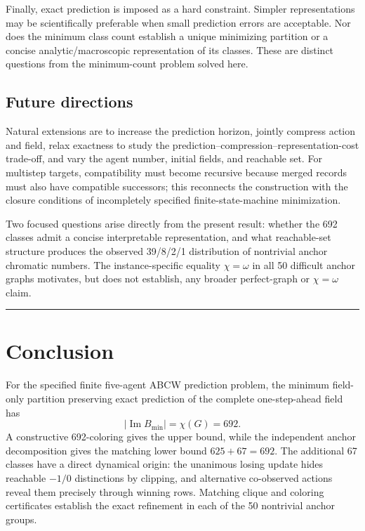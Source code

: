 \documentclass[
  11pt,
]{article}
\begin{document}
Finally, exact prediction is imposed as a hard constraint. Simpler
representations may be scientifically preferable when small prediction
errors are acceptable. Nor does the minimum class count establish a
unique minimizing partition or a concise analytic/macroscopic
representation of its classes. These are distinct questions from the
minimum-count problem solved here.

\subsection{Future directions}\label{future-directions}

Natural extensions are to increase the prediction horizon, jointly
compress action and field, relax exactness to study the
prediction--compression--representation-cost trade-off, and vary the
agent number, initial fields, and reachable set. For multistep targets,
compatibility must become recursive because merged records must also
have compatible successors; this reconnects the construction with the
closure conditions of incompletely specified finite-state-machine
minimization.

Two focused questions arise directly from the present result: whether the
692 classes admit a concise interpretable representation, and what
reachable-set structure produces the observed 39/8/2/1 distribution of
nontrivial anchor chromatic numbers. The instance-specific equality
\({\chi=\omega}\) in all 50 difficult anchor graphs motivates, but does
not establish, any broader perfect-graph or \({\chi=\omega}\) claim.

\begin{center}\rule{0.5\linewidth}{0.5pt}\end{center}

\section{Conclusion}\label{conclusion}

For the specified finite five-agent ABCW prediction problem, the minimum
field-only partition preserving exact prediction of the complete
one-step-ahead field has
\[
|\operatorname{Im}B_{\min}|=\chi(G)=692.
\]
A constructive 692-coloring gives the upper bound, while the independent
anchor decomposition gives the matching lower bound \({625+67=692}\).
The additional 67 classes have a direct dynamical origin: the unanimous
losing update hides reachable \({-1/0}\) distinctions by clipping, and
alternative co-observed actions reveal them precisely through winning
rows. Matching clique and coloring certificates establish the exact
refinement in each of the 50 nontrivial anchor groups.
\end{document}
